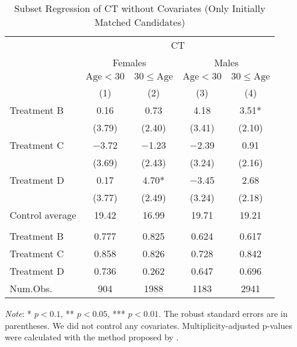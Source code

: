 \documentclass[12pt, a4paper]{article}
\begin{document}
\begin{table}[H]

\caption{\label{tab:lm-test-subset1-init}Subset Regression of CT without Covariates (Only Initially Matched Candidates)}
\centering
\fontsize{8}{10}\selectfont
\begin{threeparttable}
\begin{tabular}[t]{lcccc}
\toprule
\multicolumn{1}{c}{ } & \multicolumn{4}{c}{CT} \\
\cmidrule(l{3pt}r{3pt}){2-5}
\multicolumn{1}{c}{ } & \multicolumn{2}{c}{Females} & \multicolumn{2}{c}{Males} \\
\cmidrule(l{3pt}r{3pt}){2-3} \cmidrule(l{3pt}r{3pt}){4-5}
\multicolumn{1}{c}{ } & \multicolumn{1}{c}{$\text{Age} < 30$} & \multicolumn{1}{c}{$30 \le \text{Age}$} & \multicolumn{1}{c}{$\text{Age} < 30$} & \multicolumn{1}{c}{$30 \le \text{Age}$} \\
\cmidrule(l{3pt}r{3pt}){2-2} \cmidrule(l{3pt}r{3pt}){3-3} \cmidrule(l{3pt}r{3pt}){4-4} \cmidrule(l{3pt}r{3pt}){5-5}
  & (1) & (2) & (3) & (4)\\
\midrule
Treatment B & \num{0.16} & \num{0.73} & \num{4.18} & \num{3.51}*\\
 & (\num{3.79}) & (\num{2.40}) & (\num{3.41}) & (\num{2.10})\\
Treatment C & \num{-3.72} & \num{-1.23} & \num{-2.39} & \num{0.91}\\
 & (\num{3.69}) & (\num{2.43}) & (\num{3.24}) & (\num{2.16})\\
Treatment D & \num{0.17} & \num{4.70}* & \num{-3.45} & \num{2.68}\\
 & (\num{3.77}) & (\num{2.49}) & (\num{3.24}) & (\num{2.18})\\
\midrule
Control average & 19.42 & 16.99 & 19.71 & 19.21\\
\addlinespace[0.3em]
\multicolumn{5}{l}{\textit{Multiplicity-adjusted p-values}}\\
\hspace{1em}Treatment B & 0.777 & 0.825 & 0.624 & 0.617\\
\hspace{1em}Treatment C & 0.858 & 0.826 & 0.728 & 0.842\\
\hspace{1em}Treatment D & 0.736 & 0.262 & 0.647 & 0.696\\
Num.Obs. & \num{904} & \num{1988} & \num{1183} & \num{2941}\\
\bottomrule
\end{tabular}
\begin{tablenotes}
\item \emph{Note}: * $p < 0.1$, ** $p < 0.05$, *** $p < 0.01$. The robust standard errors are in parentheses. We did not control any covariates. Multiplicity-adjusted p-values were calculated with the method proposed by \cite{List2019}.
\end{tablenotes}
\end{threeparttable}
\end{table}
\end{document}
